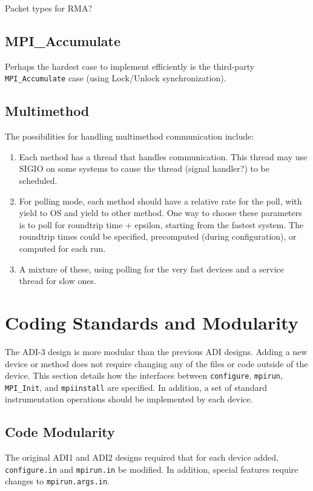 \documentclass{article}
\let\file=\texttt
\let\code=\texttt
\begin{document}
Packet types for RMA?

\subsection{MPI\_Accumulate}
Perhaps the hardest case to implement efficiently is the third-party
\code{MPI\_Accumulate} case (using Lock/Unlock synchronization).

\subsection{Multimethod}

The possibilities for handling multimethod communication include:
\begin{enumerate}
\item Each method has a thread that handles communication.  This thread may
  use SIGIO on some systems to cause the thread (signal handler?) to be
  scheduled. 
\item For polling mode, each method should have a relative rate for the poll,
  with yield to OS and yield to other method.  One way to choose these
  parameters is to poll for roundtrip time + epsilon, starting from the
  fastest system.  The roundtrip times could be specified, precomputed (during
  configuration), or computed for each run.
\item A mixture of these, using polling for the very fast devices and a
  service thread for slow ones.
\end{enumerate}

\section{Coding Standards and Modularity}
The ADI-3 design is more modular than the previous ADI designs.  Adding a new
device or method does not require changing any of the files or code outside
of the device.  This section details how the interfaces between
\code{configure}, \code{mpirun}, \code{MPI\_Init}, and \code{mpiinstall} are
specified.  In addition, a set of standard instrumentation operations should
be implemented by each device.

\subsection{Code Modularity}
The original ADI1 and ADI2 designs required that for each device added, 
\file{configure.in} and \file{mpirun.in} be modified.  In addition, special
features require changes to \file{mpirun.args.in}.  
\end{document}
